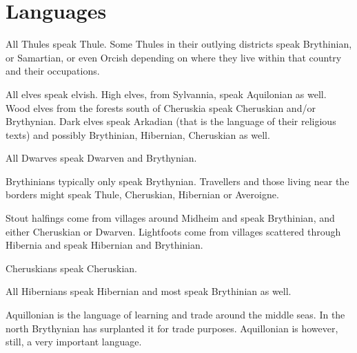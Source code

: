 \documentclass[a4paper]{dnd5}
\begin{document}
\section*{Languages}

All Thules speak Thule. Some Thules in their outlying districts speak Brythinian, or Samartian, or even Orcish depending on where they live within that country and their occupations.

All elves speak elvish.
High elves, from Sylvannia, speak Aquilonian as well.
Wood elves from the forests south of Cheruskia speak Cheruskian and/or Brythynian.
Dark elves speak Arkadian (that is the language of their religious texts) and possibly Brythinian, Hibernian, Cheruskian as well.

All Dwarves speak Dwarven and Brythynian.

Brythinians typically only speak Brythynian. Travellers and those living near the borders might speak Thule, Cheruskian, Hibernian or Averoigne.

Stout halfings come from villages around Midheim and speak Brythinian, and either Cheruskian or Dwarven.
Lightfoots come from villages scattered through Hibernia and speak Hibernian and Brythinian.

Cheruskians speak Cheruskian.

All Hibernians speak Hibernian and most speak Brythinian as well.  

Aquillonian is the language of learning and trade around the middle seas.  In the north Brythynian has surplanted it for trade purposes.  Aquillonian is however, still, a very important language.
\end{document}
